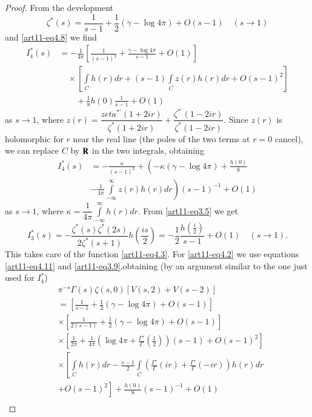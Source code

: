 \begin{proof}
From the development
$$
\zeta^{\ast} (s) = \frac{1}{s-1} + \frac{1}{2} (\gamma - \log 4 \pi)  + O(s-1) \quad (s\to 1)
$$
and \eqref{art11-eq4.8} we find 
\begin{align*}
I^\ast_4 (s) & = - \frac{1}{4 \pi} \left[\frac{1}{(s-1)^2} + \frac{\gamma - \log 4 \pi}{s -1} + O(1)\right]\\
& \quad \times \left[\int\limits_C h(r) dr + (s-1) \int\limits_C z(r) h(r) dr + O(s-1)^2 \right]\\
& \quad\quad  + \frac{1}{8}  h(0) \frac{1}{s-1} + O(1)
\end{align*}
as $s \to 1$, where $z(r) = \dfrac{zeta^{\ast'} (1+2 ir)}{\zeta^\ast (1+ 2ir )} + \dfrac{\zeta^{\ast'} (1-2ir)}{\zeta^\ast (1-2 ir)}$. Since $z(r)$ is holomorphic for $r$ near the real line (the poles of the two terms at $r=0$ cancel), we can replace $C$ by $\mathbf{R}$ in the two integrals, obtaining 
\begin{align*}
I^\ast_4 (s) & =  -\frac{\kappa}{(s-1)^2} + \left(-\kappa (\gamma - \log 4 \pi) + \frac{h(0)}{8}  \right.\\
&\left.  - \frac{1}{4 \pi} \int\limits^\infty_{-\infty} z(r) h (r) dr \right) (s-1)^{-1} + O(1)
\end{align*}
as $s \to 1$, where $\kappa = \dfrac{1}{4 \pi} \int\limits^\infty_{-\infty} h(r) dr$. From \eqref{art11-eq3.5} we get 
$$
I^\ast_3 (s) = - \frac{\zeta^\ast (s) \zeta^{\ast} (2s)}{2 \zeta^\ast (s+1)} h \left(\frac{is}{2} \right) = - \frac{1}{2} \frac{h(\frac{i}{2})}{s-1} + O(1) \quad (s \to 1).
$$
This takes care of the function \eqref{art11-eq4.3}. For \eqref{art11-eq4.2} we use equations \eqref{art11-eq4.11} and \eqref{art11-eq3.9},\pageoriginale obtaining (by an argument similar to the one just used for $I^\ast_4$) 
\begin{align*}
& \pi^{-s} \Gamma (s) \zeta(s,0) [V(s,2) + V (s-2)]\\
& = \left[ \frac{1}{s-1} + \frac{1}{2} (\gamma -\log 4 \pi) + O(s-1) \right]\\
& \times \left[\frac{1}{2 (s-1)} + \frac{1}{2} (\gamma - \log 4 \pi) + O(s-1) \right]\\
& \times \left[\frac{1}{2\pi} + \frac{1}{4 \pi} \left(\log 4 \pi +\frac{\Gamma'}{\Gamma} (\frac{1}{2}) \right) (s-1) + O(s-1)^2\right]\\
& \times \left[\int\limits_C h (r)dr - \frac{s-1}{2} \int\limits_C \left(\frac{\Gamma'}{\Gamma} (ir) + \frac{\Gamma'}{\Gamma} (-ir) \right)  h (r) dr \right.\\
&\left.  + O(s-1)^2\right] + \frac{h(0)}{8} (s-1)^{-1} + O(1)\\

\end{align*}
\end{proof}
